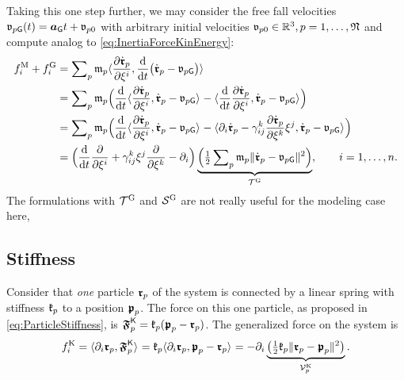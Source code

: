 \newcommand{\particleVelGravity}[1]{\particleStyle{v}_{#1\idxText{G}}}
Taking this one step further, we may consider the free fall velocities $\particleVelGravity{\PidxI}(t) = \gravityAcc t + \particleStyle{v}_{\PidxI 0}$ with arbitrary initial velocities $\mathfrak{v}_{p 0} \in \mathbb{R}^3, p=1,\ldots,\mathfrak{N}$ and compute analog to \eqref{eq:InertiaForceKinEnergy}:
\begin{align}
  \genForceInertiaCoeff{\LidxI} + \genForceGravityCoeff{\LidxI}
  &= \sumParticles \particleMass{\PidxI} \sProd{\pdiff[\particlePosd{\PidxI}]{\sysVelCoeff{\LidxI}}}{\diff{t}\big(\particlePosd{\PidxI} - \particleVelGravity{\PidxI} \big)}
 \nonumber\\
  &= \sumParticles \particleMass{\PidxI}  \Big( \diff{t} \sProd{\pdiff[\particlePosd{\PidxI}]{\sysVelCoeff{\LidxI}}}{\particlePosd{\PidxI} - \particleVelGravity{\PidxI}} - \sProd{\diff{t} \pdiff[\particlePosd{\PidxI}]{\sysVelCoeff{\LidxI}}}{\particlePosd{\PidxI} - \particleVelGravity{\PidxI}}\Big)
 \nonumber\\
  &= \sumParticles \particleMass{\PidxI}  \Big( \diff{t} \sProd{\pdiff[\particlePosd{\PidxI}]{\sysVelCoeff{\LidxI}}}{\particlePosd{\PidxI} - \particleVelGravity{\PidxI}} - \sProd{\dirDiff{\LidxI} \particlePosd{\PidxI} - \BoltzSym{\LidxIII}{\LidxI}{\LidxII} \pdiff[\particlePosd{\PidxI}]{\sysVelCoeff{\LidxIII}} \sysVelCoeff{\LidxII}}{\particlePosd{\PidxI} - \particleVelGravity{\PidxI}}\Big)
 \nonumber\\
  &= \Big(\diff{t} \pdiff{\sysVelCoeff{\LidxI}} + \BoltzSym{\LidxIII}{\LidxI}{\LidxII} \sysVelCoeff{\LidxII} \pdiff{\sysVelCoeff{\LidxIII}} - \dirDiff{\LidxI} \Big)
  \underbrace{\Big( \tfrac{1}{2} \sumParticles \particleMass{\PidxI} \norm{\particlePosd{\PidxI} - \particleVelGravity{\PidxI}}^2 \Big)}_{\kineticEnergyInertial},
  \qquad
  \LidxI = 1,\ldots,\dimConfigSpace.
\end{align}
The formulations with $\mathcal{T}^{\mathrm{G}}$ and $\mathcal{S}^{\mathrm{G}}$ are not really useful for the modeling case here, 

\subsection{Stiffness}\label{sec:ParticleSysStiffness}
Consider that \textit{one} particle $\boldsymbol{\mathfrak{r}}_{p}$ of the system is connected by a linear spring with stiffness $\mathfrak{k}_{p}$ to a position $\boldsymbol{\mathfrak{p}}_{p}$.
The force on this one particle, as proposed in \eqref{eq:ParticleStiffness}, is $\boldsymbol{\mathfrak{F}}_{p}^{\mathsf{K}} = \mathfrak{k}_{p} (\boldsymbol{\mathfrak{p}}_{p} - \boldsymbol{\mathfrak{r}}_{p})$.
The generalized force on the system is
\begin{align}
 f^{\mathrm{K}}_{i} 
 = \langle \partial_{i} \boldsymbol{\mathfrak{r}}_{p}, \boldsymbol{\mathfrak{F}}_{p}^{\mathsf{K}} \rangle_{} 
 = \mathfrak{k}_{p} \langle \partial_{i} \boldsymbol{\mathfrak{r}}_{p}, \boldsymbol{\mathfrak{p}}_{p} - \boldsymbol{\mathfrak{r}}_{p} \rangle_{}
 = -\partial_{i} \underbrace{\big( \tfrac{1}{2} \mathfrak{k}_{p} \| \boldsymbol{\mathfrak{r}}_{p} - \boldsymbol{\mathfrak{p}}_{p} \|_{}^2 \big)}_{\mathcal{V}^{\mathrm{K}}_{p}}.
\end{align}

